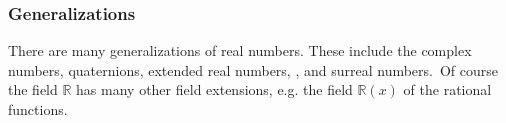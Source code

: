 \documentclass[12pt]{article}
\begin{document}
\subsubsection*{Generalizations}
There are many generalizations of real numbers. These include
the complex numbers, quaternions, extended real numbers, 
,
and surreal numbers.\, Of course the field $\mathbb{R}$ has many other field extensions, e.g. the field $\mathbb{R}(x)$ of the rational functions.
\end{document}
